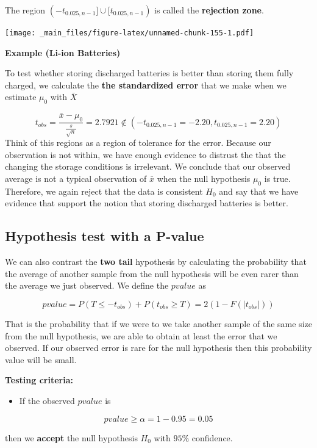 \documentclass[
]{book}
\providecommand{\tightlist}{%
  \setlength{\itemsep}{0pt}\setlength{\parskip}{0pt}}
\begin{document}
The region \((-t_{0.025, n-1}] \cup[t_{0.025, n-1})\) is called the \textbf{rejection zone}.

\texttt{[image: \_main\_files/figure-latex/unnamed-chunk-155-1.pdf]}

\textbf{Example (Li-ion Batteries)}

To test whether storing discharged batteries is better than storing them fully charged, we calculate the \textbf{the standardized error} that we make when we estimate \(\mu_0\) with \(\bar{X}\)

\[t_{obs}=\frac{\bar{x}-\mu_0}{\frac{s}{\sqrt{n}}}=2.7921 \notin (-t_{0.025, n-1}=-2.20, t_{0.025, n-1}=2.20)\]
Think of this regions as a region of tolerance for the error. Because our observation is not within, we have enough evidence to distrust the that the changing the storage conditions is irrelevant. We conclude that our observed average is not a typical observation of \(\bar{x}\) when the null hypothesis \(\mu_0\) is true. Therefore, we again reject that the data is consistent \(H_0\) and say that we have evidence that support the notion that storing discharged batteries is better.

\hypertarget{hypothesis-test-with-a-p-value}{%
\subsection{Hypothesis test with a P-value}\label{hypothesis-test-with-a-p-value}}

We can also contrast the \textbf{two tail} hypothesis by calculating the probability that the average of another sample from the null hypothesis will be even rarer than the average we just observed. We define the \(pvalue\) as

\[pvalue = P(T \leq -t_{obs}) + P(t_{obs} \geq T) = 2 (1-F(|t_{obs}|))\]

That is the probability that if we were to we take another sample of the same size from the null hypothesis, we are able to obtain at least the error that we observed. If our observed error is rare for the null hypothesis then this probability value will be small.

\textbf{Testing criteria:}

\begin{itemize}
\tightlist
\item
  If the observed \(pvalue\) is
\end{itemize}

\[pvalue \geq \alpha =1-0.95=0.05\]

then we \textbf{accept} the null hypothesis \(H_0\) with \(95\%\) confidence.
\end{document}
